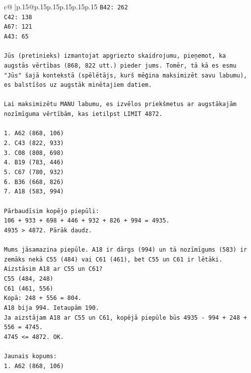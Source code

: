 \documentclass{article}
\begin{document}
{\begin{supertabular}{c@{$\;$}|p{.15\linewidth}@{}p{.15\linewidth}p{.15\linewidth}p{.15\linewidth}p{.15\linewidth}p{.15\linewidth}}
{{{\texttt{B42: 262} \\
\texttt{C42: 138} \\
\texttt{A67: 121} \\
\texttt{A43: 65} \\
\\ 
\texttt{Jūs (pretinieks) izmantojat apgriezto skaidrojumu, pieņemot, ka augstās vērtības (868, 822 utt.) pieder jums. Tomēr, tā kā es esmu "Jūs" šajā kontekstā (spēlētājs, kurš mēģina maksimizēt savu labumu), es balstīšos uz augstāk minētajiem datiem.} \\
\\ 
\texttt{Lai maksimizētu MANU labumu, es izvēlos priekšmetus ar augstākajām nozīmīguma vērtībām, kas ietilpst LIMIT 4872.} \\
\\ 
\texttt{1. A62 (868, 106)} \\
\texttt{2. C43 (822, 933)} \\
\texttt{3. C08 (808, 698)} \\
\texttt{4. B19 (783, 446)} \\
\texttt{5. C67 (780, 932)} \\
\texttt{6. B36 (668, 826)} \\
\texttt{7. A18 (583, 994)} \\
\\ 
\texttt{Pārbaudīsim kopējo piepūli:} \\
\texttt{106 + 933 + 698 + 446 + 932 + 826 + 994 = 4935.} \\
\texttt{4935 > 4872. Pārāk daudz.} \\
\\ 
\texttt{Mums jāsamazina piepūle. A18 ir dārgs (994) un tā nozīmīgums (583) ir zemāks nekā C55 (484) vai C61 (461), bet C55 un C61 ir lētāki.} \\
\texttt{Aizstāsim A18 ar C55 un C61?} \\
\texttt{C55 (484, 248)} \\
\texttt{C61 (461, 556)} \\
\texttt{Kopā: 248 + 556 = 804.} \\
\texttt{A18 bija 994. Ietaupām 190.} \\
\texttt{Ja aizstājam A18 ar C55 un C61, kopējā piepūle būs 4935 {-} 994 + 248 + 556 = 4745.} \\
\texttt{4745 <= 4872. OK.} \\
\\ 
\texttt{Jaunais kopums:} \\
\texttt{1. A62 (868, 106)} \\
}}}
\end{supertabular}}
\end{document}
